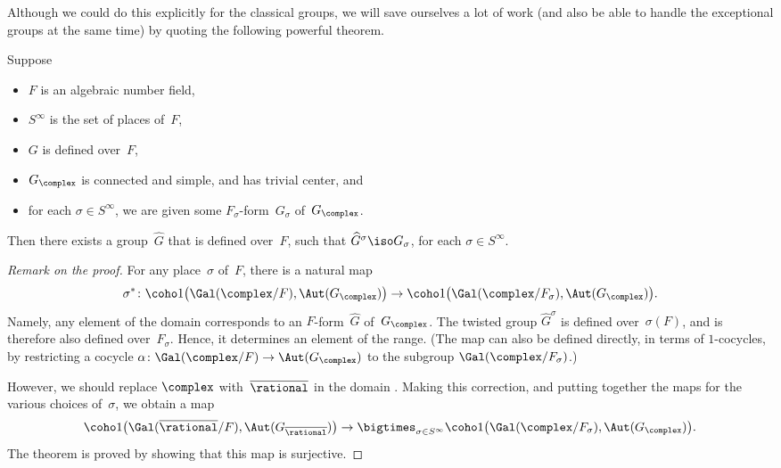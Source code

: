 Although we could do this explicitly for the classical groups, we will save ourselves a lot of work (and also be able to handle the exceptional groups at the same time) by quoting the following powerful theorem. 

\begin{thm} \label{BorelHarderLocGlob}
Suppose 
\noprelistbreak
	\begin{itemize}
	\item $F$ is an algebraic number field,
	\item $S^\infty$ is the set of places of~$F$,
	\item $G$ is defined over~$F$,
	\item $G_\complex$ is connected and simple, and has trivial center,
	and
	\item for each $\sigma \in S^\infty$, we are given some $F_\sigma$-form~$G_\sigma$ of~$G_\complex$.
	\end{itemize}
Then there exists a group~$\widehat G$ that is defined over~$F$, such that $\widehat G^\sigma \iso G_\sigma$, for each $\sigma \in S^\infty$.
\end{thm}

\begin{proof}[Remark on the proof]
For any place~$\sigma$ of~$F$, there is a natural map
	$$ \sigma^* \colon \coho1\bigl( \Gal(\complex/F), \Aut ( G_{\complex} ) \bigr) \to \coho1\bigl( \Gal(\complex/F_\sigma), \Aut ( G_{\complex} ) \bigr) .$$
Namely, any element of the domain corresponds to an $F$-form~$\widehat G$ of~$G_\complex$. The twisted group $\widehat G^\sigma$ is defined over~$\sigma(F)$, and is therefore also defined over~$F_\sigma$. Hence, it determines an element of the range. (The map can also be defined directly, in terms of $1$-cocycles, by restricting a cocycle $\alpha \colon \Gal(\complex/F) \to \Aut ( G_{\complex} )$ to the subgroup $\Gal(\complex/F_\sigma)$.)

However, we should replace $\complex$ with~$\overline{\rational}$ in the domain . Making this correction, and putting together the maps for the various choices of~$\sigma$, we obtain a map
	$$ \coho1\bigl( \Gal(\overline{\rational}/F), \Aut ( G_{\overline{\rational}} ) \bigr) \to \bigtimes_{\sigma \in S^\infty} \coho1\bigl( \Gal(\complex/F_\sigma), \Aut ( G_\complex ) \bigr) .$$
The theorem is proved by showing that this map is surjective.
\end{proof}


